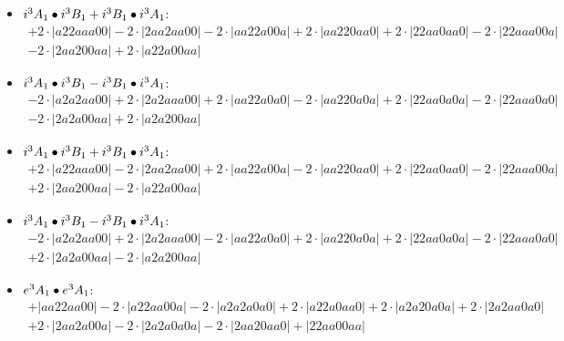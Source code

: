 \documentclass{article}
\begin{document}
\begin{itemize}
$$\begin{array}{c}
\end{array}$$
\item \boldmath$i^3 A_1 \bullet i^3 B_{1} + i^3 B_{1} \bullet i^3 A_1 \displaystyle $\unboldmath : \quad$$\begin{array}{c}
+2 \cdot \left|a22aaa00\right| -2 \cdot \left|2aa2aa00\right| -2 \cdot \left|aa22a00a\right| +2 \cdot \left|aa220aa0\right| +2 \cdot \left|22aa0aa0\right| -2 \cdot \left|22aaa00a\right| \\[0.5cm] -2 \cdot \left|2aa200aa\right| +2 \cdot \left|a22a00aa\right|
\end{array}$$
\item \boldmath$i^3 A_1 \bullet i^3 B_{1} - i^3 B_{1} \bullet i^3 A_1 \displaystyle $\unboldmath : \quad$$\begin{array}{c}
-2 \cdot \left|a2a2aa00\right| +2 \cdot \left|2a2aaa00\right| +2 \cdot \left|aa22a0a0\right| -2 \cdot \left|aa220a0a\right| +2 \cdot \left|22aa0a0a\right| -2 \cdot \left|22aaa0a0\right| \\[0.5cm] -2 \cdot \left|2a2a00aa\right| +2 \cdot \left|a2a200aa\right|
\end{array}$$
\item \boldmath$i^3 A_1 \bullet i^3 B_{1} + i^3 B_{1} \bullet i^3 A_1 \displaystyle $\unboldmath : \quad$$\begin{array}{c}
+2 \cdot \left|a22aaa00\right| -2 \cdot \left|2aa2aa00\right| +2 \cdot \left|aa22a00a\right| -2 \cdot \left|aa220aa0\right| +2 \cdot \left|22aa0aa0\right| -2 \cdot \left|22aaa00a\right| \\[0.5cm] +2 \cdot \left|2aa200aa\right| -2 \cdot \left|a22a00aa\right|
\end{array}$$
\item \boldmath$i^3 A_1 \bullet i^3 B_{1} - i^3 B_{1} \bullet i^3 A_1 \displaystyle $\unboldmath : \quad$$\begin{array}{c}
-2 \cdot \left|a2a2aa00\right| +2 \cdot \left|2a2aaa00\right| -2 \cdot \left|aa22a0a0\right| +2 \cdot \left|aa220a0a\right| +2 \cdot \left|22aa0a0a\right| -2 \cdot \left|22aaa0a0\right| \\[0.5cm] +2 \cdot \left|2a2a00aa\right| -2 \cdot \left|a2a200aa\right|
\end{array}$$
\item \boldmath$e^3 A_1 \bullet e^3 A_1 \displaystyle $\unboldmath : \quad$$\begin{array}{c}
+\left|aa22aa00\right| -2 \cdot \left|a22aa00a\right| -2 \cdot \left|a2a2a0a0\right| +2 \cdot \left|a22a0aa0\right| +2 \cdot \left|a2a20a0a\right| +2 \cdot \left|2a2aa0a0\right| \\[0.5cm] +2 \cdot \left|2aa2a00a\right| -2 \cdot \left|2a2a0a0a\right| -2 \cdot \left|2aa20aa0\right| +\left|22aa00aa\right|

\end{array}$$
\end{itemize}
\end{document}
